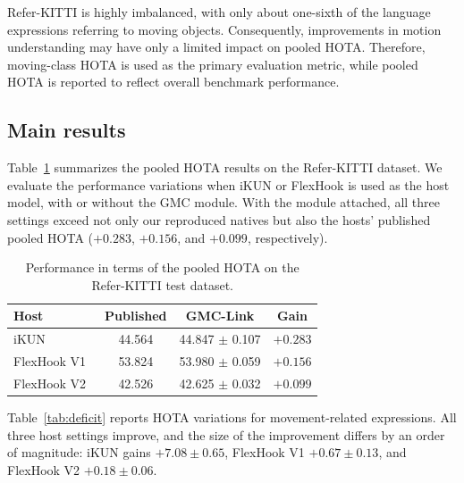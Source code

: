 \documentclass{article}
\begin{document}
Refer-KITTI is highly imbalanced, with only about one-sixth of the language expressions referring to moving objects. Consequently, improvements in motion understanding may have only a limited impact on pooled HOTA. Therefore, moving-class HOTA is used as the primary evaluation metric, while pooled HOTA is reported to reflect overall benchmark performance.

\subsection{Main results}
\label{sec:main}
Table~\ref{tab:main} summarizes the pooled HOTA results on the Refer-KITTI dataset. We evaluate the performance variations when iKUN or FlexHook is used as the host model, with or without the GMC module. With the module attached, all three settings exceed not only our reproduced natives but also the hosts' published pooled HOTA ($+0.283$, $+0.156$, and $+0.099$, respectively).


\begin{table}
  \centering
  \caption{Performance in terms of the pooled HOTA on the Refer-KITTI test dataset.}
  \label{tab:main}
  \small
  \setlength{\tabcolsep}{2pt}
  \begin{tabular}{lccc}
    \hline
    Host                        & Published & GMC-Link           & Gain                      \\
    \hline
    iKUN~\cite{ikun}            & 44.564    & 44.847 $\pm$ 0.107 & $+0.283$ \\
    FlexHook V1~\cite{flexhook} & 53.824    & 53.980 $\pm$ 0.059 & $+0.156$ \\
    FlexHook V2~\cite{flexhook} & 42.526    & 42.625 $\pm$ 0.032 & $+0.099$ \\
    \hline
  \end{tabular}
\end{table}


Table~\ref{tab:deficit} reports HOTA variations for movement-related expressions. All three host settings improve, and the size of the improvement differs by an order of magnitude: iKUN gains $+7.08\pm0.65$, FlexHook V1 $+0.67\pm0.13$, and FlexHook V2 $+0.18\pm0.06$.
\end{document}
